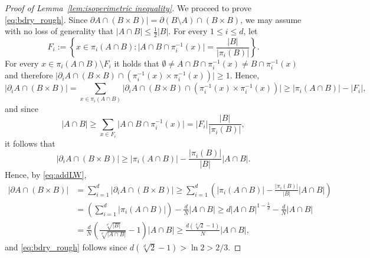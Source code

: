 \documentclass[11pt, reqno]{amsart}
\numberwithin{equation}{section}
\begin{document}
\begin{proof}[Proof of Lemma~\ref{lem:isoperimetric inequality}]
We proceed to prove \eqref{eq:bdry_rough}. Since $\partial A\cap(B\times B)\rvert =  \partial(B\setminus A)\cap(B\times B)$, we may assume with no loss of generality that $\lvert A\cap B\rvert\leq \frac{1}{2}\lvert B\rvert$.
For every $1\leq i\leq d$, let 
$$
F_i:=\left\{x\in \pi_i(A\cap B)\colon  \lvert A\cap B\cap \pi_i^{-1}(x)\rvert=\frac{\lvert B\rvert }{\lvert \pi_i(B)\rvert }\right\}.
$$
For every $x\in\pi_i(A\cap B)\setminus F_i$ it holds that $\emptyset\neq A\cap B\cap \pi_i^{-1}(x)\neq B\cap \pi_i^{-1}(x)$ and therefore $\lvert\partial_i A\cap(B\times B)\cap(\pi_i^{-1}(x)\times\pi_i^{-1}(x))\rvert\geq 1$.
Hence, 
$$
\lvert  \partial_i A\cap(B\times B)\rvert =\sum_{x\in\pi_i(A\cap B)}\lvert\partial_i A\cap(B\times B)\cap(\pi_i^{-1}(x)\times\pi_i^{-1}(x))\rvert\geq \lvert \pi_i(A\cap B)\rvert -\lvert  F_i\rvert,
$$
and since
\begin{equation*}
\lvert A\cap B\rvert\geq\sum_{x\in F_i}\lvert A\cap B\cap \pi_i^{-1}(x)\rvert=\lvert F_i\rvert \frac{\lvert B\rvert }{\lvert \pi_i(B)\rvert },
\end{equation*}
it follows that
\begin{equation*}
\lvert  \partial_i A\cap(B\times B)\rvert \geq\lvert \pi_i(A\cap B)\rvert -\frac{\lvert \pi_i(B)\rvert }{\lvert B\rvert }\lvert A\cap B\rvert .  
\end{equation*}
Hence, by \eqref{eq:addLW},
\begin{align*}
\lvert  \partial A\cap(B\times B)\rvert &=\sum_{i=1}^d\lvert  \partial_i A\cap(B\times B)\rvert \geq\sum_{i=1}^d\left(\lvert \pi_i(A\cap B)\rvert -\frac{\lvert \pi_i(B)\rvert }{\lvert B\rvert }\lvert A\cap B\rvert \right)\\
&=\left(\sum_{i=1}^d\lvert\pi_i(A\cap B)\rvert\right)-\frac{d}{N}\lvert A\cap B\rvert
\geq d\lvert  A\cap B \rvert ^{1-\frac{1}{d}}-\frac{d}{N}\lvert A\cap B\rvert\\ 
&=\frac{d}{N}\left(\frac{\sqrt[d]{\lvert B\rvert}}{\sqrt[d]{\lvert A\cap B\rvert }}-1\right)\lvert A\cap B\rvert \geq \frac{d(\sqrt[d]{2}-1)}{N}\lvert A\cap B\rvert,
\end{align*}
and \eqref{eq:bdry_rough} follows since $d(\sqrt[d]{2}-1)>\ln2>2/3$.
\end{proof}
\end{document}
